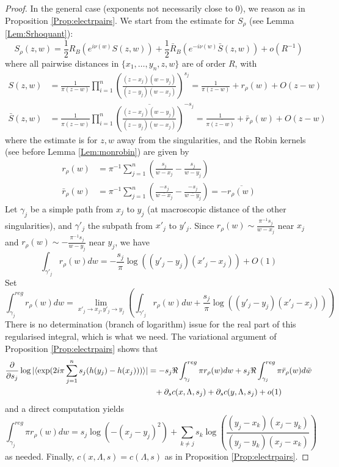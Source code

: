 \documentclass[10pt]{article}
\begin{document}
\begin{proof}
In the general case (exponents not necessarily close to $0$), we reason as in Proposition \ref{Prop:electrpairs}. We start from the estimate for $S_\rho$ (see Lemma \ref{Lem:Srhoquant}):
$$S_\rho(z,w)=\frac 12R_B\left(e^{i\nu(w)}S(z,w)\right)
+\frac 12\bar R_B\left(e^{-i\nu(w)}\bar S(z,w)\right)+o(R^{-1})$$
where all pairwise distances in $\{x_1,\dots,y_n,z,w\}$ are of order $R$, with
\begin{align*}
S(z,w)&=\frac{1}{\pi(z-w)}\prod_{i=1}^n\left(\frac {(z-x_j)(w-y_j)}{(z-y_j)(w-x_j)}\right)^{s_j}=
\frac{1}{\pi(z-w)}+r_\rho(w)+O(z-w)\\
\bar S(z,w)&=\frac{1}{\pi\overline{(z-w)}}\prod_{i=1}^n\overline{\left(\frac {(z-x_j)(w-y_j)}{(z-y_j)(w-x_j)}\right)}^{-s_j}=
\frac{1}{\pi\overline{(z-w)}}+\bar r_\rho(w)+O(z-w)
\end{align*}
where the estimate is for $z,w$ away from the singularities, and the Robin kernels (see before Lemma \ref{Lem:monrobin}) are given by 
\begin{align*}
r_\rho(w)&=
\pi^{-1}\sum_{j=1}^n\left(\frac{s_j}{w-x_j}-\frac{s_j}{w-y_j}\right)\\
\bar r_\rho(w)&=\pi^{-1}\sum_{j=1}^n\left(\frac{-s_j}{\overline{w-x_j}}-\frac{-s_j}{\overline{w-y_j}}\right)=-\overline {r_\rho(w)}
\end{align*}
Let $\gamma_j$ be a simple path from $x_j$ to $y_j$ (at macroscopic distance of the other singularities), and $\gamma'_j$ the subpath from $x'_j$ to $y'_j$. Since $r_\rho(w)\sim \frac{\pi^{-1}s_j}{w-x_j}$ near $x_j$ and $r_\rho(w)\sim -\frac{\pi^{-1}s_j}{w-y_j}$ near $y_j$, we have
$$\int_{\gamma'_j}r_\rho(w)dw=-\frac{s_j}\pi\log\left((y'_j-y_j)(x'_j-x_j)\right)+O(1)$$
Set
$$\int_{\gamma_j}^{reg} r_\rho(w)dw=\lim_{x'_j\rightarrow x_j,y'_j\rightarrow y_j}\left(\int_{\gamma'_j}r_\rho(w)dw+\frac{s_j}\pi\log\left((y'_j-y_j)(x'_j-x_j)\right)\right)$$
There is no determination (branch of logarithm) issue for the real part of this regularised integral, which is what we need. The variational argument of Proposition \ref{Prop:electrpairs} shows that
\begin{align*}
\frac{\partial}{\partial s_j}\log|\langle \exp(2i\pi\sum_{j=1}^ns_j(h(y_j)-h(x_j)))\rangle|&=-s_j\Re\int^{reg}_{\gamma_j} \pi r_\rho(w)dw+ 
s_j\Re\int^{reg}_{\gamma_j} \pi \bar r_\rho(w)d\bar w\\
&\hphantom{=}+\partial_{s} c(x,\Lambda,s_j)+\partial_{s}c(y,\Lambda,s_j)+o(1)
\end{align*}
and a direct computation yields
$$\int^{reg}_{\gamma_j}\pi r_\rho(w)dw=s_j\log(-(x_j-y_j)^2)+\sum_{k\neq j}s_k\log\left(\frac{(y_j-x_k)(x_j-y_k)}{(y_j-y_k)(x_j-x_k)}\right)
$$
as needed. Finally, $c(x,\Lambda,s)=c(\Lambda,s)$ as in Proposition \ref{Prop:electrpairs}.
\end{proof}
\end{document}
